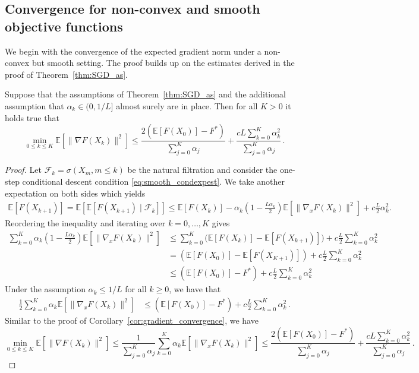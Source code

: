 \documentclass[12pt,openany]{book}
\theoremstyle{definition}
\theoremstyle{definition}
\newcommand{\cF}{\mathcal{F}}
\newcommand{\E}{\mathbb{E}}
\begin{document}
\subsection{Convergence for non-convex and smooth objective functions}
We begin with the convergence of the expected gradient norm under a non-convex but smooth setting. The proof builds up on the estimates derived in the proof of Theorem~\ref{thm:SGD_as}.

\begin{thm}\label{thm:SGDnonconvex}
    Suppose that the assumptions of Theorem~\ref{thm:SGD_as} and the additional assumption that $\alpha_k\in(0,1/L]$ almost surely are in place. Then for all $K>0$ it holds true that
    \[ \min_{0\le k\le K}\E[\|\nabla F(X_k)\|^2] \le  \frac{2(\E[F(X_0)]- F^\ast)}{\sum_{j=0}^K\alpha_j} + \frac{c L  \sum_{k=0}^K\alpha_k^2}{\sum_{j=0}^K\alpha_j} \,.\]
\end{thm}
\begin{proof}
    Let $\cF_k = \sigma(X_m,m\le k)$ be the natural filtration and consider the one-step conditional descent condition \eqref{eq:smooth_condexpest}. We take another expectation on both sides which yields
    \begin{align*}
    \E[F(X_{k+1})] = \E[\E[F(X_{k+1})\mid \cF_k]] \le \E[F(X_k)] - \alpha_k(1-\frac{L\alpha_k}2) \E[\|\nabla_x F(X_k)\|^2] + c\frac{L}2 \alpha_k^2.
    \end{align*}
    Reordering the inequality and iterating over $k=0,\dots,K$ gives
    \begin{align*}
        \sum_{k=0}^K\alpha_k(1-\frac{L\alpha_k}2) \E[\|\nabla_x F(X_k)\|^2] &\le \sum_{k=0}^K\Big(\E[F(X_k)] - \E[F(X_{k+1})]\Big) +c\frac{L}2  \sum_{k=0}^K\alpha_k^2 \\
        &= (\E[F(X_0)]- \E[F(X_{K+1})]) + c\frac{L}2  \sum_{k=0}^K\alpha_k^2\\
        &\le (\E[F(X_0)]- F^\ast) + c\frac{L}2  \sum_{k=0}^K\alpha_k^2
    \end{align*}
    Under the assumption $\alpha_k\le 1/L$ for all $k\ge0$, we have that
    \begin{align*}
        \frac12\sum_{k=0}^K\alpha_k \E[\|\nabla_x F(X_k)\|^2] &\le  (\E[F(X_0)]- F^\ast) + c\frac{L}2  \sum_{k=0}^K\alpha_k^2\,.
    \end{align*}
    Similar to the proof of Corollary~\ref{cor:gradient_convergence}, we have
    \[ \min_{0\le k\le K}\E[\|\nabla F(X_k)\|^2] \le \frac1{\sum_{j=0}^K\alpha_j}\sum_{k=0}^K\alpha_k \E[\|\nabla_x F(X_k)\|^2] \le  \frac{2(\E[F(X_0)]- F^\ast)}{\sum_{j=0}^K\alpha_j} + \frac{cL  \sum_{k=0}^K\alpha_k^2}{\sum_{j=0}^K\alpha_j} \,.\]
\end{proof}
\end{document}
